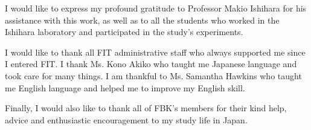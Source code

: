 \documentclass[uplatex,
12pt, %
a4paper,
english, %
oneside,
titlepage,
singlespacing, %
liststotoc, %
headsepline,
]{MastersDoctoralThesis} %
\begin{document}



\mainmatter %

\pagestyle{thesis} %



 



 

\begin{acknowledgements}
\addchaptertocentry{\acknowledgementname} %
%
I would like to express my profound gratitude to Professor Makio Ishihara for his assistance with this work, as well as to all the students who worked in the Ishihara laboratory and participated in the study's experiments.

\vspace{+0.5cm}
I would like to thank all FIT administrative staff who always supported me since I entered FIT. I thank Ms. Kono Akiko who taught me Japanese language and took care for many things. I am thankful to Ms. Samantha Hawkins who taught me English language and helped me to improve my English skill. 

\vspace{+0.5cm}
Finally, I would also like to thank all of FBK’s members for their kind help, advice and enthusiastic encouragement to my study life in Japan.
%

\end{acknowledgements}




\end{document}
